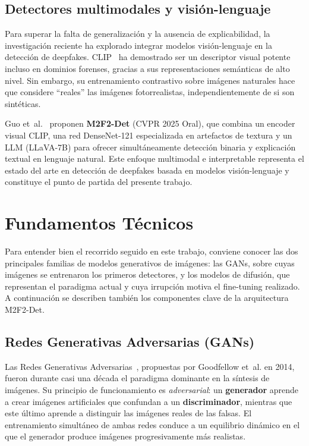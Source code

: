 \documentclass[pdflatex,sn-mathphys-num]{sn-jnl}
\begin{document}
\subsection{Detectores multimodales y visión-lenguaje}

Para superar la falta de generalización y la ausencia de explicabilidad, la investigación reciente ha explorado integrar modelos visión-lenguaje en la detección de deepfakes. CLIP~\cite{radford2021clip} ha demostrado ser un descriptor visual potente incluso en dominios forenses, gracias a sus representaciones semánticas de alto nivel. Sin embargo, su entrenamiento contrastivo sobre imágenes naturales hace que considere ``reales'' las imágenes fotorrealistas, independientemente de si son sintéticas.

Guo et~al.~\cite{guo2025m2f2det} proponen \textbf{M2F2-Det} (CVPR 2025 Oral), que combina un encoder visual CLIP, una red DenseNet-121 especializada en artefactos de textura y un LLM (LLaVA-7B) para ofrecer simultáneamente detección binaria y explicación textual en lenguaje natural. Este enfoque multimodal e interpretable representa el estado del arte en detección de deepfakes basada en modelos visión-lenguaje y constituye el punto de partida del presente trabajo.

\section{Fundamentos Técnicos}\label{sec:background}

Para entender bien el recorrido seguido en este trabajo, conviene conocer las dos principales familias de modelos generativos de imágenes: las GANs, sobre cuyas imágenes se entrenaron los primeros detectores, y los modelos de difusión, que representan el paradigma actual y cuya irrupción motiva el fine-tuning realizado. A continuación se describen también los componentes clave de la arquitectura M2F2-Det.

\subsection{Redes Generativas Adversarias (GANs)}\label{subsec:gans}

Las Redes Generativas Adversarias~\cite{goodfellow2014generative}, propuestas por Goodfellow et~al. en 2014, fueron durante casi una década el paradigma dominante en la síntesis de imágenes. Su principio de funcionamiento es \emph{adversarial}: un \textbf{generador} aprende a crear imágenes artificiales que confundan a un \textbf{discriminador}, mientras que este último aprende a distinguir las imágenes reales de las falsas. El entrenamiento simultáneo de ambas redes conduce a un equilibrio dinámico en el que el generador produce imágenes progresivamente más realistas.
\end{document}
